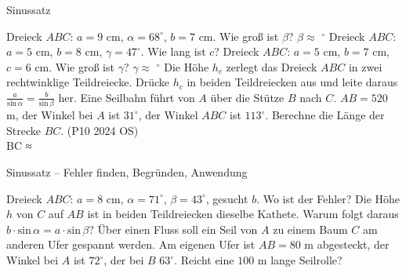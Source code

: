 \begin{aufgabe}{Sinussatz}
\begin{teile}
\teil Dreieck $ABC$: $a = 9$ cm, $\alpha = 68^\circ$, $b = 7$ cm. Wie groß ist $\beta$? $\beta \approx$ \leerfeld $^\circ$
\teil Dreieck $ABC$: $a = 5$ cm, $b = 8$ cm, $\gamma = 47^\circ$. Wie lang ist $c$? \leerfeld[cm]
\teil Dreieck $ABC$: $a = 5$ cm, $b = 7$ cm, $c = 6$ cm. Wie groß ist $\gamma$? $\gamma \approx$ \leerfeld $^\circ$
\teil Die Höhe $h_c$ zerlegt das Dreieck $ABC$ in zwei rechtwinklige Teildreiecke. Drücke $h_c$ in beiden Teildreiecken aus und leite daraus $\frac{a}{\mathrm{sin}\,\alpha} = \frac{b}{\mathrm{sin}\,\beta}$ her.
\teil Eine Seilbahn führt von $A$ über die Stütze $B$ nach $C$. $AB = 520$ m, der Winkel bei $A$ ist $31^\circ$, der Winkel $ABC$ ist $113^\circ$. Berechne die Länge der Strecke $BC$. \hfill (P10 2024 OS) \\ BC ≈ \leerfeld[m]
\end{teile}
\end{aufgabe}

\begin{aufgabe}{Sinussatz – Fehler finden, Begründen, Anwendung}
\begin{teile}
\teil Dreieck $ABC$: $a = 8$ cm, $\alpha = 71^\circ$, $\beta = 43^\circ$, gesucht $b$. Wo ist der Fehler? 
\teil Die Höhe $h$ von $C$ auf $AB$ ist in beiden Teildreiecken dieselbe Kathete. Warum folgt daraus $b \cdot \mathrm{sin}\,\alpha = a \cdot \mathrm{sin}\,\beta$?
\teil Über einen Fluss soll ein Seil von $A$ zu einem Baum $C$ am anderen Ufer gespannt werden. Am eigenen Ufer ist $AB = 80$ m abgesteckt, der Winkel bei $A$ ist $72^\circ$, der bei $B$ $63^\circ$. Reicht eine $100$ m lange Seilrolle?
\end{teile}
\end{aufgabe}
